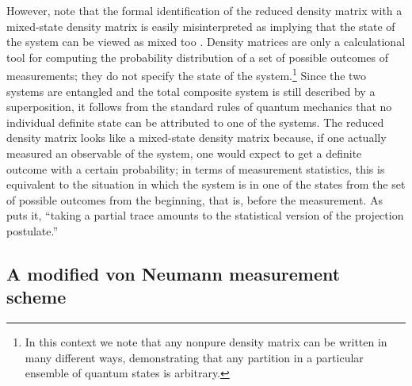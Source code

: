 \documentclass[twocolumn,rmp,aps,amsmath,amsfonts,noshowkeys,noshowpacs]{revtex4}
\begin{document}
However, note that the formal identification of the reduced density
matrix with a mixed-state density matrix is easily misinterpreted as
implying that the state of the system can be viewed as mixed too
\citep[see also the discussion by][]{Espagnat:1988:cf}.  Density
matrices are only a calculational tool for computing the probability
distribution of a set of possible outcomes of measurements; they do
not specify the state of the system.\footnote{In this context we note
  that any nonpure density matrix can be written in many different
  ways, demonstrating that any partition in a particular ensemble of
  quantum states is arbitrary.}  Since the two systems are entangled
and the total composite system is still described by a superposition,
it follows from the standard rules of quantum mechanics that no
individual definite state can be attributed to one of the systems. The
reduced density matrix looks like a mixed-state density matrix
because, if one actually measured an observable of the system, one
would expect to get a definite outcome with a certain probability; in
terms of measurement statistics, this is equivalent to the situation
in which the system is in one of the states from the set of possible
outcomes from the beginning, that is, before the measurement.  As
\citet[p.~432]{Pessoa:1998:yl} puts it, ``taking a partial trace
amounts to the statistical version of the projection postulate.''


\subsection{A modified von Neumann measurement scheme}
\end{document}
